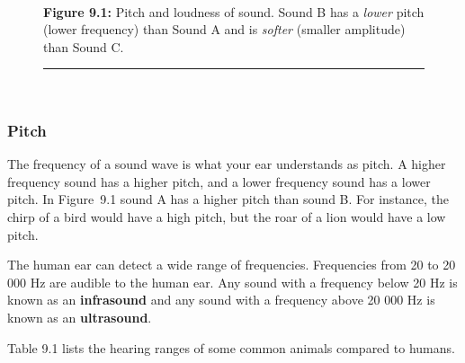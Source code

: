 \begin{figure}[H]
\begin{center}
{      \vspace{2pt}
    \vspace{\rubberspace}\par }
    \\
        \begin{cnxcaption}
	  \small \textbf{Figure 9.1: }Pitch and loudness of sound. Sound B has a \textsl{lower} pitch (lower frequency) than Sound A and is \textsl{softer} (smaller amplitude) than Sound C.
	\end{cnxcaption}
    \vspace{.1in}
    \rule[.1in]{\figurerulewidth}{.005in} \\
    \end{center}
 \end{figure}       
      \label{m38799*uid2}
            \subsubsection{ Pitch}
            \nopagebreak
            \label{m38799*id183534}The frequency of a sound wave is what your ear understands as pitch. A higher frequency sound has a higher pitch, and a lower frequency sound has a lower pitch. In Figure~9.1 sound A has a higher pitch than sound B. For instance, the chirp of a bird would have a high pitch, but the roar of a lion would have a low pitch.\par 
        \label{m38799*id183546}The human ear can detect a wide range of frequencies. Frequencies from 20 to 20 000 Hz are audible to the human ear. Any sound with a frequency below 20 Hz is known as an \textbf{infrasound} and any sound with a frequency above 20 000 Hz is known as an \textbf{ultrasound}. \par 
        \label{m38799*id183561}Table 9.1 lists the hearing ranges of some common animals compared to humans.\par 
